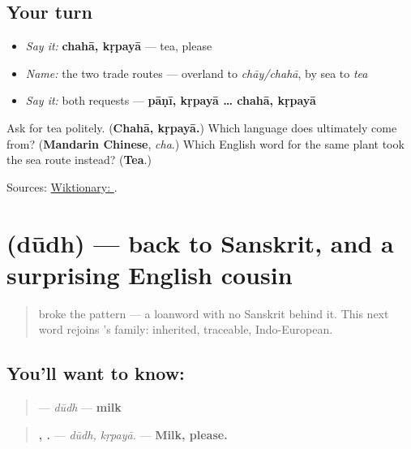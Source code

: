 \subsection*{Your turn}
\begin{itemize}
\raggedright
  \item \emph{Say it:} \textbf{chahā, kṛpayā} — tea, please
  \item \emph{Name:} the two trade routes — overland to \emph{chāy/chahā}, by sea to \emph{tea}
  \item \emph{Say it:} both requests — \textbf{pāṇī, kṛpayā … chahā, kṛpayā}
\end{itemize}

\begin{tcolorbox}[breakable,colback=teal!4,colframe=teal!35!black,title={Before you move on}]
Ask for tea politely. (\textbf{Chahā, kṛpayā.}) Which language does \textbf{} ultimately come from? (\textbf{Mandarin Chinese}, \emph{cha}.) Which English word for the same plant took the sea route instead? (\textbf{Tea}.)

Sources: \href{https://en.wiktionary.org/wiki/\%E0\%A4\%9A\%E0\%A4\%B9\%E0\%A4\%BE}{Wiktionary: }.
\end{tcolorbox}
\section[dūdh]{ (dūdh) — back to Sanskrit, and a surprising English cousin}

\label{lesson:MR-C10-dudh}



\begin{quote}
\textbf{} broke the pattern — a loanword with no Sanskrit behind it. This next word rejoins \textbf{}'s family: inherited, traceable, Indo-European.
\end{quote}

\subsection*{You'll want to know: }
\begin{quote}
\textbf{} — \emph{dūdh} — \textbf{milk}
\end{quote}

\begin{quote}
\textbf{, .} — \emph{dūdh, kṛpayā.} — \textbf{Milk, please.}
\end{quote}

